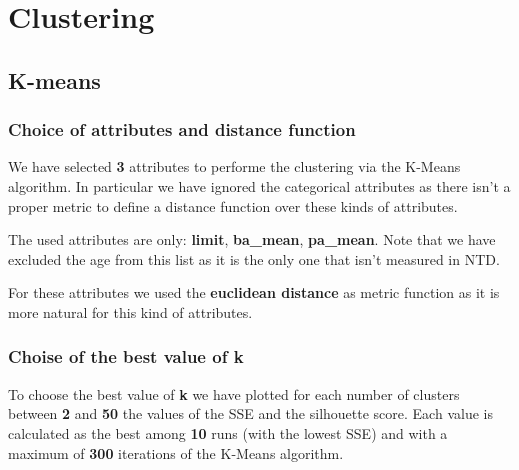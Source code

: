  \chapter{Clustering}

\section{K-means}
\subsection{Choice of attributes and distance function}

We have selected \textbf{3} attributes to performe the clustering via the K-Means algorithm.
In particular we have ignored the categorical attributes as there isn't a proper metric to define a distance function over these kinds of attributes.

The used attributes are only: \textbf{limit}, \textbf{ba\_mean}, \textbf{pa\_mean}. Note that we have excluded the age from this list as it is the only one that isn't measured in NTD.

For these attributes we used the \textbf{euclidean distance} as metric function as it is more natural for this kind of attributes.

\subsection{Choise of the best value of k}

To choose the best value of \textbf{k} we have plotted for each number of clusters between \textbf{2} and \textbf{50} the values of the SSE and the silhouette score. Each value is calculated as the best among \textbf{10} runs (with the lowest SSE) and with a maximum of \textbf{300} iterations of the K-Means algorithm.

